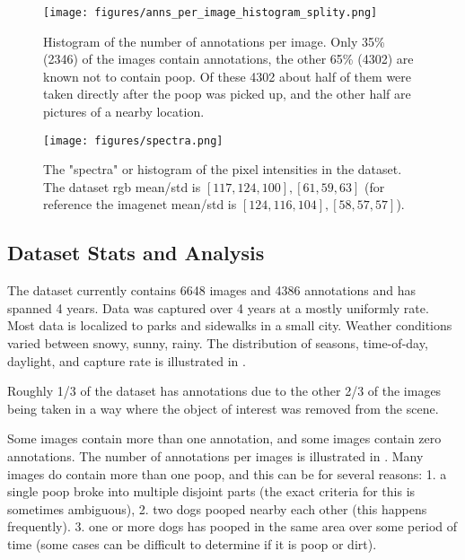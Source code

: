 \documentclass[10pt,twocolumn,letterpaper]{article}
\begin{document}
\begin{figure}[h]
\centering
\texttt{[image: figures/anns\_per\_image\_histogram\_splity.png]}
\caption[]{
    Histogram of the number of annotations per image. 
    Only 35\% (2346) of the images contain annotations, the other 65\% (4302)
    are known not to contain poop. Of these 4302 about half of them were taken
    directly after the poop was picked up, and the other half are pictures of a
    nearby location.
}
\label{fig:AnnotsPerImage}
\end{figure}


\begin{figure}[h]
\centering
\texttt{[image: figures/spectra.png]}
\caption[]{
    The "spectra" or histogram of the pixel intensities in the dataset. 
    The dataset rgb  mean/std is $[117, 124, 100], [61, 59, 63]$ (for reference
    the imagenet mean/std is $[124, 116, 104], [58, 57, 57]$).
}
\label{fig:spectra}
\end{figure}

\subsection{Dataset Stats and Analysis}


The dataset currently contains 6648 images and 4386 annotations and has spanned
4 years. Data was captured over 4 years at a mostly uniformly rate.  Most data
is localized to parks and sidewalks in a small city.  Weather conditions varied
between snowy, sunny, rainy.  The distribution of seasons, time-of-day,
daylight, and capture rate is illustrated in .

Roughly 1/3 of the dataset has annotations due to the other 2/3 of the
images being taken in a way where the object of interest was removed from the
scene.

Some images contain more than one annotation, and some images contain zero annotations.
The number of annotations per images is illustrated in .
Many images do contain more than one poop, and this can be for several reasons:
    1. a single poop broke into multiple disjoint parts (the exact criteria for this is sometimes ambiguous), 
    2. two dogs pooped nearby each other (this happens frequently). 
    3. one or more dogs has pooped in the same area over some period of
       time (some cases can be difficult to determine if it is poop or dirt).
\end{document}
